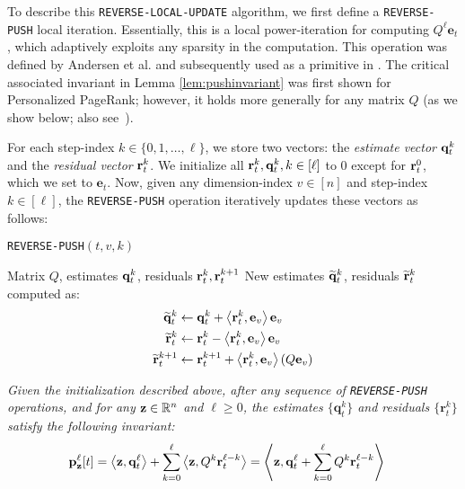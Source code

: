 To describe this \texttt{REVERSE-LOCAL-UPDATE} algorithm, we first define a \texttt{REVERSE-PUSH} local iteration. 
Essentially, this is a local power-iteration for computing $Q^{\ell}\mathbf{e}_t$, which adaptively exploits any sparsity in the computation.
This operation was defined by Andersen et al. \cite{andersen2007local} and subsequently used as a primitive in \cite{banerjee2015fast, lee2014asynchronous}.
The critical associated invariant in Lemma \ref{lem:pushinvariant} was first shown for Personalized PageRank\cite{andersen2007local}; however, it holds more generally for any matrix $Q$ (as we show below; also see~\cite{lee2014asynchronous}).
 

For each step-index $k \in\{0,1,\ldots,\ell \}$, we store two vectors: the \emph{estimate vector} $\mathbf{q}^{k}_t$ and the \emph{residual vector} $\mathbf{r}^{k}_t$.
We initialize all $\mathbf{r}^{k}_t,\mathbf{q}^{k}_t, k\in[\ell]$ to $0$ except for $\mathbf{r}^{0}_t$, which we set to $\mathbf{e}_t$.
Now, given any dimension-index $v\in[n]$ and step-index $k \in[\ell]$, the \texttt{REVERSE-PUSH} operation iteratively updates these vectors as follows:
\begin{algorithm}[!ht]
\caption{\texttt{REVERSE-PUSH}$(t,v,k)$}
\label{alg:push}
\begin{algorithmic}[1]
\REQUIRE Matrix $Q$, estimates $\mathbf{q}^{k}_t$, residuals $\mathbf{r}^{k}_t,\mathbf{r}^{k+1}_t$
\RETURN New estimates $\widetilde{\mathbf{q}}^{k}_t$, residuals $\widetilde{\mathbf{r}}^{k}_t$ computed as:
\begin{align*}
	\widetilde{\mathbf{q}}^{k}_t &\leftarrow \mathbf{q}^{k}_t + \left< \mathbf{r}^{k}_t, \mathbf{e}_v \right>\mathbf{e}_v \\
	\widetilde{\mathbf{r}}^{k}_t &\leftarrow \mathbf{r}^{k}_t - \left< \mathbf{r}^{k}_t, \mathbf{e}_v \right>\mathbf{e}_v \\
	\widetilde{\mathbf{r}}^{k+1}_t &\leftarrow \mathbf{r}^{k+1}_t + \left< \mathbf{r}^{k}_t, \mathbf{e}_v \right>(Q\mathbf{e}_v)
\end{align*}	
\end{algorithmic}
\end{algorithm}    

\begin{lemma}
\label{lem:pushinvariant}
\emph{Given the initialization described above, after any sequence of \texttt{REVERSE-PUSH} operations, and for any $\mathbf{z}\in\mathbb{R}^n$ and $\ell\geq 0$, the estimates $\{\mathbf{q}_t^k\}$ and residuals $\{\mathbf{r}_t^k\}$  satisfy the following invariant:
\begin{align*}
\mathbf{p}_{\mathbf{z}}^{\ell}[t] &= \left< \mathbf{z}, \mathbf{q}_t^{\ell} \right> + \sum_{k=0}^{\ell} \left<\mathbf{z}, Q^k\mathbf{r}_t^{\ell-k}\right> = \left< \mathbf{z}, \mathbf{q}_t^{\ell}  + \sum_{k=0}^{\ell} Q^k\mathbf{r}_t^{\ell-k}\right>
\end{align*}
}
\end{lemma}

